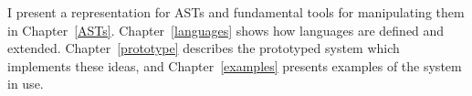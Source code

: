 
I present a representation for ASTs and fundamental tools for manipulating them in Chapter~\ref{ASTs}. Chapter~\ref{languages} shows how languages are defined and extended. Chapter~\ref{prototype} describes the prototyped system which implements these ideas, and Chapter~\ref{examples} presents examples of the system in use. 


